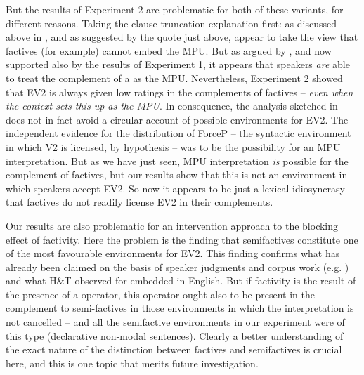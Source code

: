 \documentclass[output=paper]{langsci/langscibook}
\begin{document}
But the results of Experiment 2 are problematic for both of these variants, for different reasons. Taking the clause-truncation explanation first: as discussed above in , and as suggested by the quote just above, \citeauthor{WiklundEtAl2009} appear to take the view that factives (for example) cannot embed the MPU. But as argued by \citeauthor{Simons2007}, and now supported also by the results of Experiment 1, it appears that speakers \textit{are} able to treat the complement of a  as the MPU.  Nevertheless, Experiment 2 showed that EV2 is always given low ratings in the complements of factives -- \textit{even when the context sets this up as the MPU}.  In consequence, the analysis sketched in \citet{WiklundEtAl2009} does not in fact avoid a circular account of possible environments for EV2. The independent evidence for the distribution of ForceP -- the syntactic environment in which V2 is licensed, by hypothesis -- was to be the possibility for an MPU interpretation. But as we have just seen, MPU interpretation \textit{is} possible for the complement of factives, but our results show that this is not an environment in which speakers accept EV2.  So now it appears to be just a lexical idiosyncrasy that factives do not readily license EV2 in their complements.

Our results are also problematic for an intervention approach to the blocking effect of factivity. Here the problem is the finding that semifactives constitute one of the most favourable environments for EV2. This finding confirms what has already been claimed on the basis of speaker judgments and corpus work (e.g. \citealt{WiklundEtAl2009,JensenChristensen2013,Julien2015}) and what H\&T observed for embedded  in English. But if factivity is the result of the presence of a  operator,  this operator ought also to be present in the complement to semi-factives in those environments in which the  interpretation is not cancelled -- and all the semifactive environments in our experiment were of this type (declarative non-modal sentences).  Clearly a better understanding of the exact nature of the distinction between factives and semifactives is crucial here, and this is one topic that merits future investigation.
\end{document}
